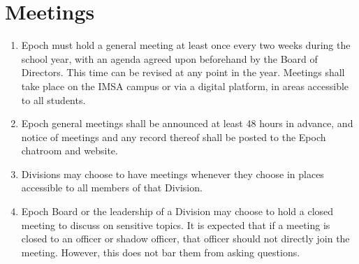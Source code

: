 \documentclass{article}
\begin{document}
\section{Meetings}
\begin{enumerate}
    \item Epoch must hold a general meeting at least once every two weeks during the school year, with an agenda agreed upon beforehand by the Board of Directors. This time can be revised at any point in the year. Meetings shall take place on the IMSA campus or via a digital platform, in areas accessible to all students.
    \item Epoch general meetings shall be announced at least 48 hours in advance, and notice of meetings and any record thereof shall be posted to the Epoch chatroom and website.
    \item Divisions may choose to have meetings whenever they choose in places accessible to all members of that Division.
    \item Epoch Board or the leadership of a Division may choose to hold a closed meeting to discuss on sensitive topics. It is expected that if a meeting is closed to an officer or shadow officer, that officer should not directly join the meeting. However, this does not bar them from asking questions.
\end{enumerate}
\end{document}
